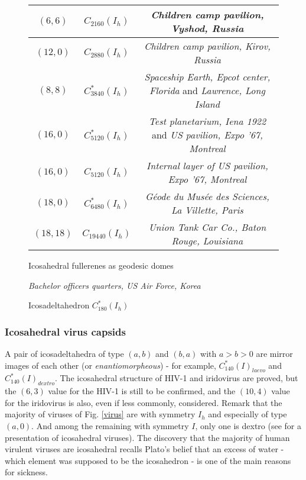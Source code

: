 \begin{figure}[htbp]
\begin{center}
\begin{tabular}{|c|c|c|}
$(6,6)$ & $C_{2160}(I_h)$ & {\it Children camp pavilion, Vyshod, Russia}  \\ \hline
$(12,0)$ & $C_{2880}(I_h)$ & {\it Children camp pavilion, Kirov, Russia} \\ \hline
$(8,8)$ & $C^*_{3840}(I_h)$ & {\it Spaceship Earth, Epcot center, Florida} and {\it Lawrence, Long Island} \\ \hline
$(16,0)$ & $C^*_{5120}(I_h)$ & {\it Test planetarium, Iena 1922} and {\it US pavilion, Expo '67, Montreal} \\ \hline
$(16,0)$ & $C_{5120}(I_h)$ & {\it Internal layer of US pavilion, Expo '67, Montreal} \\ \hline
$(18,0)$ & $C^*_{6480}(I_h)$ & {\it G\'eode du Mus\'ee des Sciences, La Villette, Paris} \\ \hline
$(18,18)$ & $C_{19440}(I_h)$ & {\it Union Tank Car Co., Baton Rouge, Louisiana} \\ \hline
\end{tabular}
\caption{Icosahedral fullerenes as geodesic domes}\label{domes}
\end{center}
\end{figure}
\begin{figure}[htbp]
\begin{center}
\caption{Icosadeltahedron $C^*_{180}(I_h)$}\label{korea}
{\it Bachelor officers quarters, US Air Force, Korea}
\end{center}
\end{figure}

\newpage
\subsubsection{Icosahedral virus capsids}
A pair of icosadeltahedra of type $(a,b)$ and $(b,a)$ with $a>b>0$ are 
mirror images of each other (or {\it enantiomorpheous}) 
- for example, $C^*_{140}(I)_{laevo}$
and $C^*_{140}(I)_{dextro}$. 
The icosahedral structure of HIV-1 and iridovirus are proved, but the $(6,3)$ value
for the HIV-1 is still to be confirmed, and the $(10,4)$ value for the iridovirus is also, even if less
commonly, considered. Remark that the majority of viruses of Fig. \ref{virus} are with symmetry $I_h$
and especially of type $(a,0)$. And among the remaining with symmetry $I$, only one is dextro
(see \cite{ddub} for a presentation of icosahedral viruses).
The discovery 
that the majority of human virulent viruses are icosahedral 
recalls Plato's belief that an excess of water - which element
was supposed to be the icosahedron - is one of the main reasons for sickness.

